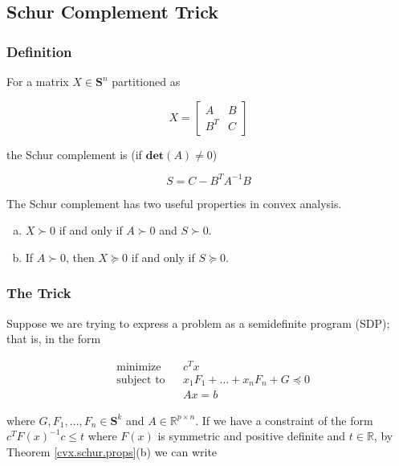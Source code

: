 \subsection{Schur Complement Trick}\label{cvx.schur.sec}

\subsubsection{Definition}

For a matrix \(X \in \boldsymbol{S}^n\) partitioned as 

\[
X = \begin{bmatrix} A & B \\ B^T & C\end{bmatrix}
\]

the Schur complement is (if \(\textbf{det}(A) \neq 0\))

\[
S = C - B^TA^{-1} B
\]

The Schur complement has two useful properties in convex analysis.

\begin{theorem}\label{cvx.schur.props}

\begin{enumerate}[(a)]

\item \(X \succ 0\) if and only if \(A \succ 0\) and \(S \succ 0\).

\item If \(A \succ 0\), then \(X \succeq 0\) if and only if \(S \succeq 0\).

\end{enumerate}

\end{theorem}

\subsubsection{The Trick}

Suppose we are trying to express a problem as a semidefinite program (SDP); that is, in the form

\[
\begin{aligned}
& {\text{minimize}}
& & c^T x \\
& \text{subject to}
& & x_1F_1 + \ldots + x_n F_n + G \preceq 0 \\
& & & Ax = b
\end{aligned}
\]

where \(G, F_1, \ldots, F_n \in \boldsymbol{S}^k\) and \(A \in \mathbb{R}^{p \times n}\). If we have a constraint of the form \(c^TF(x)^{-1}c  \leq t\) where \(F(x)\) is symmetric and positive definite and \(t \in \mathbb{R}\), by Theorem \ref{cvx.schur.props}(b) we can write

